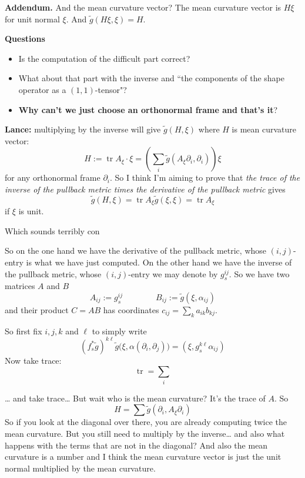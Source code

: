 \textbf{Addendum.} And the mean curvature vector? The mean curvature vector is \(H\xi\) for unit normal \(\xi\). And \(\tilde{g}(H\xi,\xi)=H\).

\textbf{Questions} 
\begin{itemize}
\item Is the computation of the difficult part correct?
\item What about that part with the inverse and ``the components of the shape operator as a \((1,1)\)-tensor"?
\item \textbf{Why can't we just choose an orthonormal frame and that's it}? 
\end{itemize}

\iffalse
\textbf{Lance:} multiplying by the inverse will give \(\tilde{g}(H,\xi)\) where \(H\) is mean curvature vector:
\[H:=\operatorname{tr}A_{\xi}\cdot\xi=\left(\sum_i \tilde{g}(A_{\xi}\partial_i,\partial_i)\right)\xi\]
for any orthonormal frame \(\partial_i\). So I think I'm aiming to prove that \textit{the trace of the inverse of the pullback metric times the derivative of the pullback metric} gives \[\tilde{g}(H,\xi)=\operatorname{tr}A_\xi \tilde{g}(\xi,\xi)=\operatorname{tr}A_{\xi}\] if \(\xi\) is unit.

Which sounds terribly con



So on the one hand we have the derivative of the pullback metric, whose \((i,j)\)-entry is what we have just computed. On the other hand we have the inverse of the pullback metric, whose \((i,j)\)-entry we may denote by \(g^{ij}_s\). So we have two matrices \(A\) and \(B\)
 \[A_{ij}:=g_s^{ij}\qquad \qquad B_{ij}:=\tilde{g}(\xi,\alpha_{ij})\]
and their product \(C=AB\) has coordinates  \(c_{ij}=\sum_k a_{ik}b_{kj}\).

So first fix \(i,j,k\) and \(\ell\) to simply write
\[(f^* _s\tilde{g})^{k\ell}\tilde{g}\Big(\xi,\alpha(\partial_i,\partial_j)\Big)=(\xi,g^{k \ell}_s\alpha_{ij})\]
Now take trace:
\[\operatorname{tr}=\sum_i \]


… and take trace… But wait who is the mean curvature? It's the trace of \(A\). So
\[H=\sum \tilde{g}(\partial_i,A_{\xi}\partial_i)\]
So if you look at the diagonal over there, you are already computing twice the mean curvature. But you still need to multiply by the inverse… and also what happens with the terms that are not in the diagonal? And also the mean curvature is a number and I think the mean curvature vector is just the unit normal multiplied by the mean curvature.

